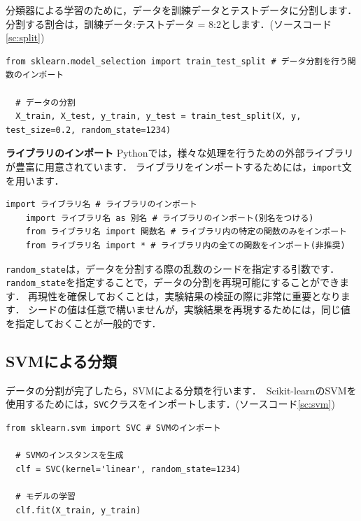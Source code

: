 \documentclass{jarticle}
\begin{document}
分類器による学習のために，データを訓練データとテストデータに分割します．
分割する割合は，訓練データ:テストデータ = 8:2とします．(ソースコード\ref{sc:split})

\begin{lstlisting}[caption=データの分割, label=sc:split]
  from sklearn.model_selection import train_test_split # データ分割を行う関数のインポート

  # データの分割
  X_train, X_test, y_train, y_test = train_test_split(X, y, test_size=0.2, random_state=1234)
\end{lstlisting}

\begin{itembox}[l]{\textbf{ライブラリのインポート}}
  Pythonでは，様々な処理を行うための外部ライブラリが豊富に用意されています．
  ライブラリをインポートするためには，\texttt{import}文を用います．

  \begin{lstlisting}[caption={ライブラリのインポート}]
    import ライブラリ名 # ライブラリのインポート
    import ライブラリ名 as 別名 # ライブラリのインポート(別名をつける)
    from ライブラリ名 import 関数名 # ライブラリ内の特定の関数のみをインポート
    from ライブラリ名 import * # ライブラリ内の全ての関数をインポート(非推奨)
  \end{lstlisting}

\end{itembox}

\texttt{random\_state}は，データを分割する際の乱数のシードを指定する引数です．
\texttt{random\_state}を指定することで，データの分割を再現可能にすることができます．
再現性を確保しておくことは，実験結果の検証の際に非常に重要となります．
シードの値は任意で構いませんが，実験結果を再現するためには，同じ値を指定しておくことが一般的です．

\subsection{SVMによる分類}
データの分割が完了したら，SVMによる分類を行います．\
Scikit-learnのSVMを使用するためには，\texttt{SVC}クラスをインポートします．(ソースコード\ref{sc:svm})

\begin{lstlisting}[caption=SVMによる分類, label=sc:svm]
  from sklearn.svm import SVC # SVMのインポート

  # SVMのインスタンスを生成
  clf = SVC(kernel='linear', random_state=1234)

  # モデルの学習
  clf.fit(X_train, y_train)
\end{lstlisting}
\end{document}
